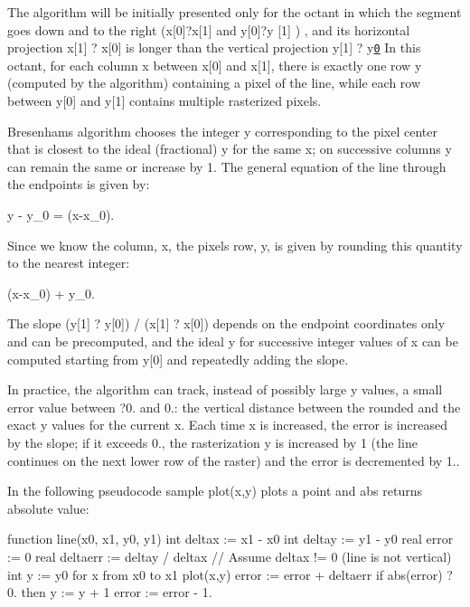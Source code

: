 The algorithm will be initially presented only for the octant in which the segment goes down and to the right (x\mbox{[}0\mbox{]}?x\mbox{[}1\mbox{]} and y\mbox{[}0\mbox{]}?y \mbox{[}1\mbox{]} ) , and its horizontal projection x\mbox{[}1\mbox{]} ? x\mbox{[}0\mbox{]} is longer than the vertical projection y\mbox{[}1\mbox{]} ? y\href{in other words, the line has
 a slope less than 1 and greater than 0.}{\tt 0} In this octant, for each column x between x\mbox{[}0\mbox{]} and x\mbox{[}1\mbox{]}, there is exactly one row y (computed by the algorithm) containing a pixel of the line, while each row between y\mbox{[}0\mbox{]} and y\mbox{[}1\mbox{]} contains multiple rasterized pixels.

Bresenham\textquotesingle{}s algorithm chooses the integer y corresponding to the pixel center that is closest to the ideal (fractional) y for the same x; on successive columns y can remain the same or increase by 1. The general equation of the line through the endpoints is given by\+: \begin{DoxyVerb}y - y_0 =  (x-x_0).
\end{DoxyVerb}


Since we know the column, x, the pixel\textquotesingle{}s row, y, is given by rounding this quantity to the nearest integer\+: \begin{DoxyVerb} (x-x_0) + y_0.
\end{DoxyVerb}


The slope (y\mbox{[}1\mbox{]} ? y\mbox{[}0\mbox{]}) / (x\mbox{[}1\mbox{]} ? x\mbox{[}0\mbox{]}) depends on the endpoint coordinates only and can be precomputed, and the ideal y for successive integer values of x can be computed starting from y\mbox{[}0\mbox{]} and repeatedly adding the slope.

In practice, the algorithm can track, instead of possibly large y values, a small error value between ?0. and 0.\+: the vertical distance between the rounded and the exact y values for the current x. Each time x is increased, the error is increased by the slope; if it exceeds 0., the rasterization y is increased by 1 (the line continues on the next lower row of the raster) and the error is decremented by 1..

In the following pseudocode sample plot(x,y) plots a point and abs returns absolute value\+:

function line(x0, x1, y0, y1) int deltax \+:= x1 -\/ x0 int deltay \+:= y1 -\/ y0 real error \+:= 0 real deltaerr \+:= deltay / deltax // Assume deltax != 0 (line is not vertical) int y \+:= y0 for x from x0 to x1 plot(x,y) error \+:= error + deltaerr if abs(error) ? 0. then y \+:= y + 1 error \+:= error -\/ 1.

